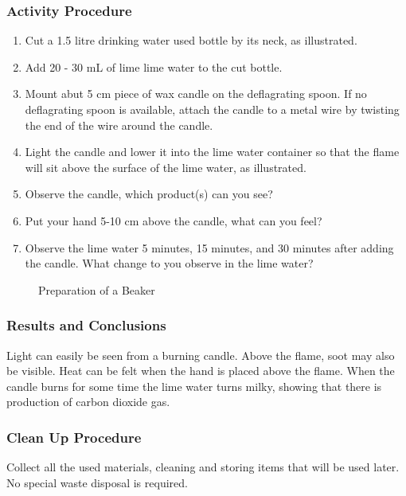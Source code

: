 \subsubsection*{Activity Procedure}
\begin{enumerate}
\item{Cut a 1.5 litre drinking water used bottle by its neck, as illustrated.}
\item{Add 20 - 30 mL of lime lime water to the cut bottle.}
\item{Mount abut 5 cm piece of wax candle on the deflagrating spoon. If no deflagrating spoon is available, attach the candle to a metal wire by twisting the end of the wire around the candle.}
\item{Light the candle and lower it into the lime water container so that the flame will sit above the surface of the lime water, as illustrated.}
\item{Observe the candle, which product(s) can you see?}
\item{Put your hand 5-10 cm above the candle, what can you feel?}
\item{Observe the lime water 5 minutes, 15 minutes, and 30 minutes after adding the candle. What change to you observe in the lime water?}
\end{enumerate}

\begin{figure}[h]
\begin{center}
\def\svgwidth{350pt}

\caption{Preparation of a Beaker}
\end{center}
\end{figure}

\subsubsection*{Results and Conclusions}
Light can easily be seen from a burning candle. Above the flame, soot may also be visible. Heat can be felt when the hand is placed above the flame. When the candle burns for some time the lime water turns milky, showing that there is production of carbon dioxide gas.

\subsubsection*{Clean Up Procedure}
Collect all the used materials, cleaning and storing items that will be used later. No special waste disposal is required.

